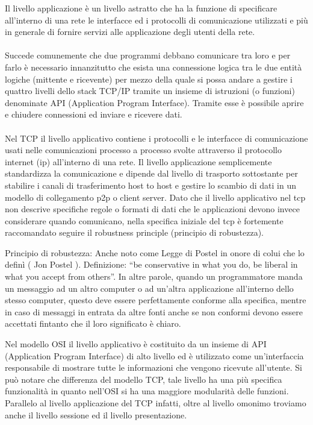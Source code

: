 \documentclass{report}%
\begin{document}
Il livello applicazione è un livello astratto che ha la funzione di specificare all'interno di una rete le interfacce ed i protocolli di comunicazione utilizzati e più in generale di fornire servizi alle applicazione degli utenti della rete.\\\\
Succede comunemente che due programmi debbano comunicare tra loro e per farlo è necessario innanzitutto che esista una connessione logica tra le due entità logiche (mittente e ricevente) per mezzo della quale si possa andare  a gestire i quattro livelli dello stack TCP/IP tramite un insieme di istruzioni (o funzioni) denominate API (Application Program Interface). Tramite esse è possibile aprire e chiudere connessioni ed inviare e ricevere dati.
\\\\Nel TCP il livello applicativo contiene i protocolli e le interfacce di comunicazione usati nelle comunicazioni processo a processo svolte attraverso il protocollo internet (ip) all'interno di una rete.
Il livello applicazione semplicemente standardizza la comunicazione e dipende dal livello di trasporto sottostante per stabilire i canali di trasferimento host to host e gestire lo scambio di dati in un modello di collegamento p2p o client server. 
Dato che il livello applicativo nel tcp non descrive specifiche regole o formati di dati che le applicazioni devono invece considerare quando comunicano, nella specifica iniziale del tcp è fortemente raccomandato seguire il robustness principle (principio di robustezza). 
	
	Principio di robustezza: Anche noto come Legge di Postel in onore di colui che lo definì 		( Jon Postel ). 
			Definizione: “be conservative in what you do, be liberal in what you accept 			from others”. In altre parole, quando un programmatore manda un messaggio 			ad un altro computer o ad un'altra applicazione all'interno dello stesso 				computer, questo deve essere perfettamente conforme alla specifica, mentre 			in caso di messaggi in entrata da altre fonti anche se non conformi devono 			essere accettati fintanto che il loro significato è chiaro.


Nel modello OSI il livello applicativo è costituito da un insieme di API (Application Program Interface) di alto livello ed è utilizzato come un'interfaccia responsabile di mostrare tutte le informazioni che vengono ricevute all'utente. Si può notare che differenza del modello TCP, tale livello ha una più specifica funzionalità in quanto nell'OSI si ha una maggiore modularità delle funzioni. Parallelo al livello applicazione del TCP infatti, oltre al livello omonimo troviamo anche il livello sessione ed il livello presentazione. 
\end{document}
